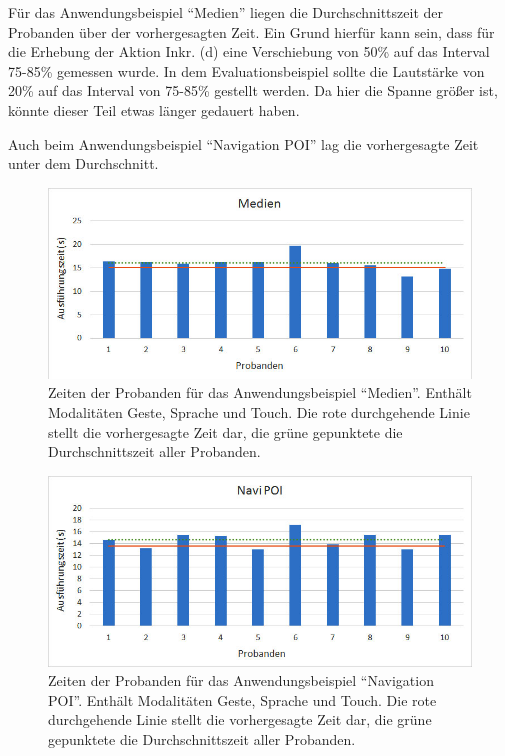 Für das Anwendungsbeispiel "`Medien"' liegen die Durchschnittszeit der Probanden über der vorhergesagten Zeit.
Ein Grund hierfür kann sein, dass für die Erhebung der Aktion Inkr. (d) eine Verschiebung von 50\% auf das Interval 75-85\% gemessen wurde.
In dem Evaluationsbeispiel sollte die Lautstärke von 20\% auf das Interval von 75-85\% gestellt werden.
Da hier die Spanne größer ist, könnte dieser Teil etwas länger gedauert haben. 

Auch beim Anwendungsbeispiel "`Navigation POI"' lag die vorhergesagte Zeit unter dem Durchschnitt. 
\begin{figure}[ht]
			\centering
			\includegraphics[width=1\textwidth]{img/Medien_Times.jpg}
			\caption[Zeiten der Probanden für das Anwendungsbeispiel "`Medien"'.]{Zeiten der Probanden für das Anwendungsbeispiel "`Medien"'. Enthält Modalitäten Geste, Sprache und Touch. Die rote durchgehende Linie stellt die vorhergesagte Zeit dar, die grüne gepunktete die Durchschnittszeit aller Probanden.}
			\label{fig:Medien_Times}
\end{figure}
\begin{figure}[ht]
			\centering
			\includegraphics[width=1\textwidth]{img/Navi_POI_Times.jpg}
			\caption[Zeiten der Probanden für das Anwendungsbeispiel "`Navigation POI"'.]{Zeiten der Probanden für das Anwendungsbeispiel "`Navigation POI"'. Enthält Modalitäten Geste, Sprache und Touch. Die rote durchgehende Linie stellt die vorhergesagte Zeit dar, die grüne gepunktete die Durchschnittszeit aller Probanden.}
			\label{fig:Navi_POI_Times}		
\end{figure}

